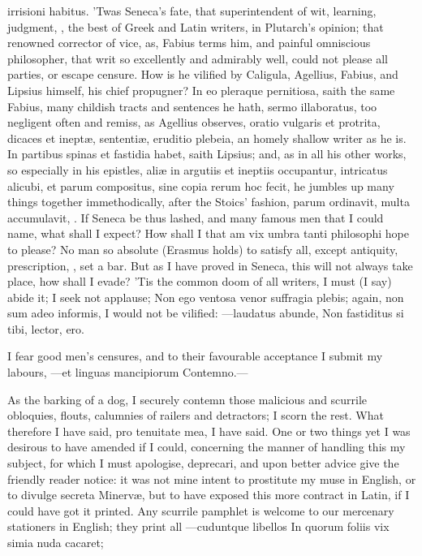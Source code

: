 {{irrisioni habitus}. 'Twas Seneca's fate, that superintendent of
wit, learning, judgment, , the best of Greek and
Latin writers, in Plutarch's opinion; that renowned corrector of vice,
as, Fabius terms him, and painful omniscious philosopher, that
writ so excellently and admirably well, could not please all parties,
or escape censure. How is he vilified by  Caligula, Agellius,
Fabius, and Lipsius himself, his chief propugner? In eo pleraque
pernitiosa, saith the same Fabius, many childish tracts and sentences
he hath, sermo illaboratus, too negligent often and remiss, as Agellius
observes, oratio vulgaris et protrita, dicaces et inept\ae{}, sententi\ae{},
eruditio plebeia, an homely shallow writer as he is. In partibus spinas
et fastidia habet, saith Lipsius; and, as in all his other works,
so especially in his epistles, ali\ae{} in argutiis et ineptiis
occupantur, intricatus alicubi, et parum compositus, sine copia rerum
hoc fecit, he jumbles up many things together immethodically, after the
Stoics' fashion, parum ordinavit, multa accumulavit, \etc. If Seneca be
thus lashed, and many famous men that I could name, what shall I
expect? How shall I that am vix umbra tanti philosophi hope to please?
No man so absolute (Erasmus holds) to satisfy all, except
antiquity, prescription, \etc, set a bar. But as I have proved in
Seneca, this will not always take place, how shall I evade? 'Tis the
common doom of all writers, I must (I say) abide it; I seek not
applause; Non ego ventosa venor suffragia plebis; again, non sum
adeo informis, I would not be vilified:
---laudatus abunde,
Non fastiditus si tibi, lector, ero.

I fear good men's censures, and to their favourable acceptance I submit
my labours,
---et linguas mancipiorum
Contemno.---

As the barking of a dog, I securely contemn those malicious and
scurrile obloquies, flouts, calumnies of railers and detractors; I
scorn the rest. What therefore I have said, pro tenuitate mea, I have
said.
One or two things yet I was desirous to have amended if I could,
concerning the manner of handling this my subject, for which I must
apologise, deprecari, and upon better advice give the friendly reader
notice: it was not mine intent to prostitute my muse in English, or to
divulge secreta Minerv\ae{}, but to have exposed this more contract in
Latin, if I could have got it printed. Any scurrile pamphlet is welcome
to our mercenary stationers in English; they print all
---cuduntque libellos
In quorum foliis vix simia nuda cacaret;

}
